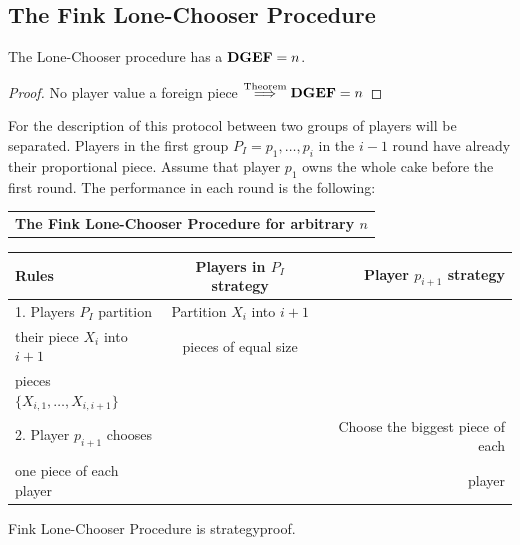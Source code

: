 \subsection{The Fink Lone-Chooser Procedure}
\begin{satz}
 The Lone-Chooser procedure has a $\text{\textbf{DGEF}} = n$.
\end{satz}
\begin{proof}
 No player value a foreign piece $\stackrel{\text{Theorem}}{\Longrightarrow}\text{\textbf{DGEF}}=n$
\end{proof}
For the description of this protocol between two groups of players will be separated. Players in the first group $P_I={p_1, \dots, p_i}$ in the $i-1$ round have already their proportional piece. Assume that player $p_1$ owns the whole cake before the first round. The performance in each round is the following:\\
\newline
\begin{tabular*}{\textwidth}[]{|c|}
\hline
\hline
\textbf{The Fink Lone-Chooser Procedure for arbitrary $n$}\\
\end{tabular*}
\begin{tabular*}{\textwidth}[]{|l|c|r|}
\hline
\textbf{Rules}& \textbf{Players in $P_I$ strategy}& \textbf{Player $p_{i+1}$ strategy}\\
\hline
1. Players $P_I$ partition &Partition $X_i$ into $i+1$&\\
their piece $X_i$ into $i+1$&pieces of equal size&\\
pieces $\{X_{i,1},\dots, X_{i,i+1}\}$&&\\
\hline
2. Player $p_{i+1}$ chooses&&Choose the biggest piece of each \\
one piece of each player&&player\\
\hline
\end{tabular*}
\begin{satz}
Fink Lone-Chooser Procedure is strategyproof.
\end{satz}
